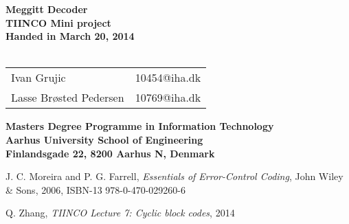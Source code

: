 \documentclass[a4paper,10pt]{report}
\begin{document}
\begin{titlepage}
\begin{center}
{\LARGE \textbf{Meggitt Decoder}}\\
{\large \textbf{TIINCO Mini project}}\\

\vspace{4cm}
\textbf{Handed in March 20, 2014}\\~\\
\begin{tabular}{ll}
Ivan Grujic & 10454@iha.dk \\
Lasse Brøsted Pedersen & 10769@iha.dk \\
\end{tabular}
\vfill
\textbf{Masters Degree Programme in Information Technology}\\
\textbf{Aarhus University School of Engineering}\\
\textbf{Finlandsgade 22, 8200 Aarhus N, Denmark}
\end{center}
\end{titlepage}

\setcounter{tocdepth}{1}
\tableofcontents

\listoffixmes















\begin{thebibliography}{9}

J. C. Moreira and P. G. Farrell, \emph{Essentials of Error-Control Coding}, John Wiley \& Sons, 2006,
ISBN-13 978-0-470-029260-6

Q. Zhang, \emph{TIINCO Lecture 7: Cyclic block codes}, 2014


\end{thebibliography}
\end{document}
